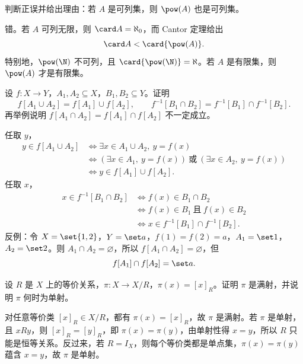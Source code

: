 \begin{exercise}[level=advanced]
判断正误并给出理由：若 $A$ 是可列集，则 $\pow(A)$ 也是可列集。
\begin{solution}
错。若 $A$ 可列无限，则 $\card A=\aleph_0$，而 Cantor 定理给出
  \[
  \card A<\card{\pow(A)}.
  \]
  特别地，$\pow(\N)$ 不可列，且 $\card{\pow(\N)}=\aleph$。若 $A$ 是有限集，则 $\pow(A)$ 才是有限集。
\end{solution}
\end{exercise}

\begin{exercise}[level=advanced]
设 $f:X\to Y$，$A_1,A_2\subseteq X$，$B_1,B_2\subseteq Y$。证明
  \[
  f[A_1\cup A_2]=f[A_1]\cup f[A_2],\qquad
  f^{-1}[B_1\cap B_2]=f^{-1}[B_1]\cap f^{-1}[B_2].
  \]
  再举例说明 $f[A_1\cap A_2]=f[A_1]\cap f[A_2]$ 不一定成立。
\begin{solution}
任取 $y$，
  \[
  \begin{aligned}
  y\in f[A_1\cup A_2]
  &\Longleftrightarrow \exists x\in A_1\cup A_2,\ y=f(x)\\
  &\Longleftrightarrow (\exists x\in A_1,\ y=f(x))\ \text{或}\ (\exists x\in A_2,\ y=f(x))\\
  &\Longleftrightarrow y\in f[A_1]\cup f[A_2].
  \end{aligned}
  \]
  任取 $x$，
  \[
  \begin{aligned}
  x\in f^{-1}[B_1\cap B_2]
  &\Longleftrightarrow f(x)\in B_1\cap B_2\\
  &\Longleftrightarrow f(x)\in B_1\ \text{且}\ f(x)\in B_2\\
  &\Longleftrightarrow x\in f^{-1}[B_1]\cap f^{-1}[B_2].
  \end{aligned}
  \]
  反例：令 $X=\set{1,2}$，$Y=\set a$，$f(1)=f(2)=a$，$A_1=\set1$，$A_2=\set2$。则 $A_1\cap A_2=\varnothing$，所以 $f[A_1\cap A_2]=\varnothing$，但
  \[
  f[A_1]\cap f[A_2]=\set a.
  \]
\end{solution}
\end{exercise}

\begin{exercise}[level=advanced]
设 $R$ 是 $X$ 上的等价关系，$\pi:X\to X/R$，$\pi(x)=[x]_R$。证明 $\pi$ 是满射，并说明 $\pi$ 何时为单射。
\begin{solution}
对任意等价类 $[x]_R\in X/R$，都有 $\pi(x)=[x]_R$，故 $\pi$ 是满射。若 $\pi$ 是单射，且 $xRy$，则 $[x]_R=[y]_R$，即 $\pi(x)=\pi(y)$，由单射性得 $x=y$，所以 $R$ 只能是恒等关系。反过来，若 $R=I_X$，则每个等价类都是单点集，$\pi(x)=\pi(y)$ 蕴含 $x=y$，故 $\pi$ 是单射。
\end{solution}
\end{exercise}

